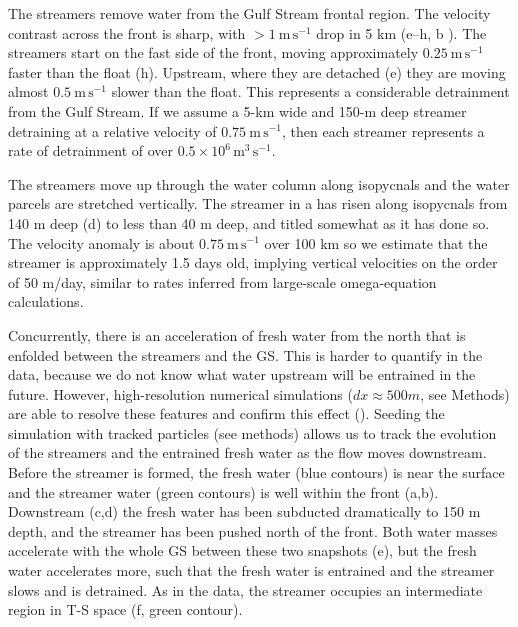 \documentclass{natureJMK}
\begin{document}
The streamers remove water from the Gulf Stream frontal region.  The velocity contrast across the front is  sharp, with $>1\ \mathrm{m\,s^{-1}}$ drop in 5 km (e--h, b ).  The streamers start on the fast side of the front, moving approximately $0.25\ \mathrm{m\,s^{-1}}$ faster than the float (h). Upstream, where they are detached (e) they are moving almost $0.5\ \mathrm{m\,s^{-1}}$ slower than the float.  This represents a considerable detrainment from the Gulf Stream.  If we assume a 5-km wide and 150-m deep streamer detraining at a relative velocity of $0.75\ \mathrm{m\,s^{-1}}$, then each streamer represents a rate of detrainment of over $0.5\times10^{6}\, \mathrm{m^{3}\,s^{-1}}$.  

The streamers move up through the water column along isopycnals and the water parcels are stretched vertically. The streamer in a has risen along isopycnals from 140 m deep (d)  to less than 40 m deep, and titled somewhat as it has done so.   The velocity anomaly is about $0.75\ \mathrm{m\,s^{-1}}$ over 100 km so we estimate that the streamer is approximately 1.5 days old,  implying vertical velocities on the order of 50 m/day, similar to rates inferred from large-scale omega-equation calculations\cite{thomasjoyce10}.  

Concurrently, there is an acceleration of fresh water from the north that is enfolded between the streamers and the GS.  This is harder to quantify in the data, because we do not know what water upstream will be entrained in the future.  However, high-resolution numerical simulations ($dx\approx 500 m$, see Methods) are able to resolve these features and confirm this effect (). Seeding the simulation with tracked particles (see methods) allows us to track the evolution of the streamers and the entrained fresh water as the flow moves downstream.  Before the streamer is formed, the fresh water (blue contours) is near the surface and the streamer water (green contours) is well within the front (a,b).  Downstream (c,d) the fresh water has been subducted dramatically to 150 m depth, and the streamer has been pushed north of the front.  Both water masses accelerate with the whole GS between these two snapshots (e), but the fresh water accelerates more, such that the fresh water is entrained and the streamer slows and is detrained.  As in the data, the streamer occupies an intermediate region in T-S space (f, green contour).  
\end{document}

